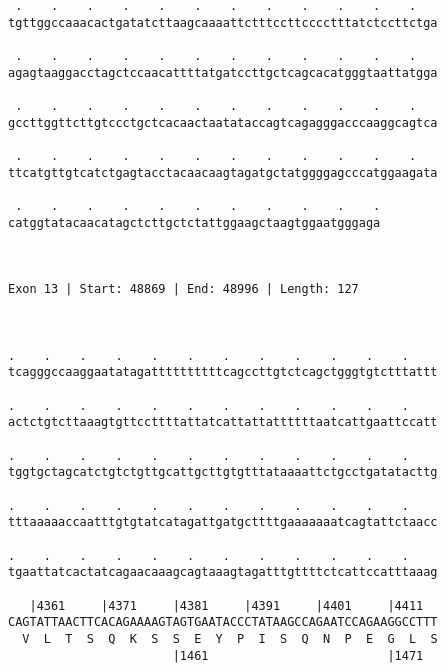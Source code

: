 \documentclass{article}
\begin{document}
\begin{Verbatim}
 .    .    .    .    .    .    .    .    .    .    .    .   
tgttggccaaacactgatatcttaagcaaaattctttccttcccctttatctccttctga
                                                            
 .    .    .    .    .    .    .    .    .    .    .    .   
agagtaaggacctagctccaacattttatgatccttgctcagcacatgggtaattatgga
                                                            
 .    .    .    .    .    .    .    .    .    .    .    .   
gccttggttcttgtccctgctcacaactaatataccagtcagagggacccaaggcagtca
                                                            
 .    .    .    .    .    .    .    .    .    .    .    .   
ttcatgttgtcatctgagtacctacaacaagtagatgctatggggagcccatggaagata
                                                            
 .    .    .    .    .    .    .    .    .    .    .
catggtatacaacatagctcttgctctattggaagctaagtggaatgggaga
                                                    
                                                    
 
Exon 13 | Start: 48869 | End: 48996 | Length: 127



.    .    .    .    .    .    .    .    .    .    .    .    
tcagggccaaggaatatagattttttttttcagccttgtctcagctgggtgtctttattt
                                                            
.    .    .    .    .    .    .    .    .    .    .    .    
actctgtcttaaagtgttccttttattatcattattattttttaatcattgaattccatt
                                                            
.    .    .    .    .    .    .    .    .    .    .    .    
tggtgctagcatctgtctgttgcattgcttgtgtttataaaattctgcctgatatacttg
                                                            
.    .    .    .    .    .    .    .    .    .    .    .    
tttaaaaaccaatttgtgtatcatagattgatgcttttgaaaaaaatcagtattctaacc
                                                            
.    .    .    .    .    .    .    .    .    .    .    .    
tgaattatcactatcagaacaaagcagtaaagtagatttgttttctcattccatttaaag
                                                            
   |4361     |4371     |4381     |4391     |4401     |4411  
CAGTATTAACTTCACAGAAAAGTAGTGAATACCCTATAAGCCAGAATCCAGAAGGCCTTT
  V  L  T  S  Q  K  S  S  E  Y  P  I  S  Q  N  P  E  G  L  S
                       |1461                         |1471  
  

\end{Verbatim}
\end{document}
